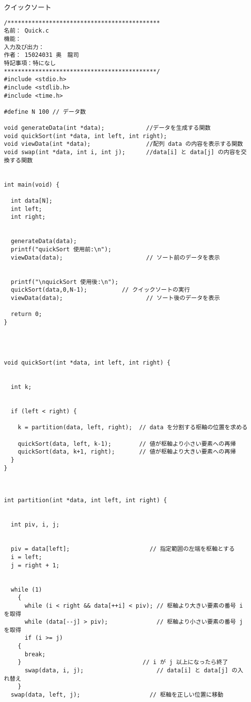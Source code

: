 \documentclass[a4j,titlepage]{jarticle}
\begin{document}
\begin{breakitembox}[l]{クイックソート} \small
\begin{verbatim}
/********************************************
名前： Quick.c
機能： 
入力及び出力： 
作者： 15024031 奥　龍司
特記事項：特になし
********************************************/
#include <stdio.h>
#include <stdlib.h>
#include <time.h>

#define N 100 // データ数

void generateData(int *data);            //データを生成する関数
void quickSort(int *data, int left, int right);
void viewData(int *data);                //配列 data の内容を表示する関数
void swap(int *data, int i, int j);      //data[i] と data[j] の内容を交換する関数


int main(void) {
  
  int data[N];
  int left;
  int right;

  
  generateData(data);
  printf("quickSort 使用前:\n");
  viewData(data);                        // ソート前のデータを表示
  

  printf("\nquickSort 使用後:\n");
  quickSort(data,0,N-1);          // クイックソートの実行
  viewData(data);                        // ソート後のデータを表示
  
  return 0;
}




void quickSort(int *data, int left, int right) {
  
  
  int k;
  
  
  if (left < right) {
    
    k = partition(data, left, right);  // data を分割する枢軸の位置を求める
    
    quickSort(data, left, k-1);        // 値が枢軸より小さい要素への再帰
    quickSort(data, k+1, right);       // 値が枢軸より大きい要素への再帰
  }
}



int partition(int *data, int left, int right) {
  
  
  int piv, i, j;
  

  piv = data[left];                       // 指定範囲の左端を枢軸とする
  i = left;
  j = right + 1;
  

  while (1) 
    {
      while (i < right && data[++i] < piv); // 枢軸より大きい要素の番号 i を取得
      while (data[--j] > piv);              // 枢軸より小さい要素の番号 j を取得
      if (i >= j)
	{ 
	  break; 
	}                                   // i が j 以上になったら終了
      swap(data, i, j);                     // data[i] と data[j] の入れ替え
    }
  swap(data, left, j);                    // 枢軸を正しい位置に移動
  

\end{verbatim}
\end{breakitembox}
\end{document}
